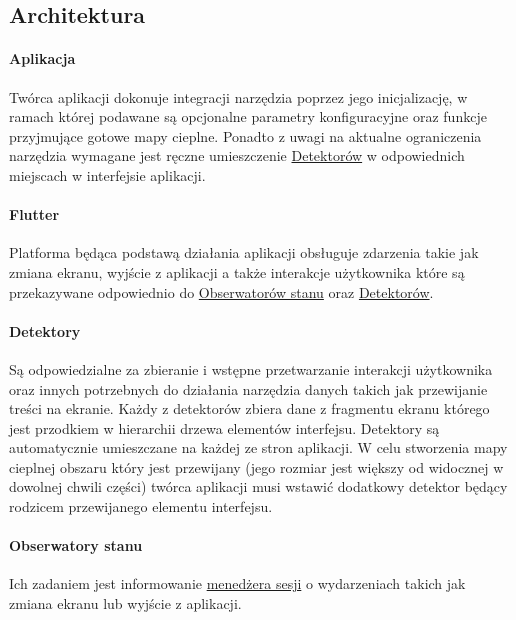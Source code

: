 \subsection{Architektura}

\paragraph{Aplikacja}
Twórca aplikacji dokonuje integracji narzędzia poprzez jego inicjalizację, w ramach której podawane są  opcjonalne parametry konfiguracyjne oraz funkcje przyjmujące gotowe mapy cieplne. Ponadto z uwagi na aktualne ograniczenia narzędzia wymagane jest ręczne umieszczenie \hyperref[par:rs_detectors]{Detektorów} w odpowiednich miejscach w interfejsie aplikacji.

\paragraph{Flutter} Platforma będąca podstawą działania aplikacji obsługuje zdarzenia takie jak zmiana ekranu, wyjście z aplikacji a także interakcje użytkownika które są przekazywane odpowiednio do \hyperref[par:rs_observers]{Obserwatorów stanu} oraz \hyperref[par:rs_detectors]{Detektorów}.

\paragraph{Detektory} 
\label{par:rs_detectors}
Są odpowiedzialne za zbieranie i wstępne przetwarzanie interakcji użytkownika oraz innych potrzebnych do działania narzędzia danych takich jak przewijanie treści na ekranie. Każdy z detektorów zbiera dane z fragmentu ekranu którego jest przodkiem w hierarchii drzewa elementów interfejsu. Detektory są automatycznie umieszczane na każdej ze stron aplikacji. W celu stworzenia mapy cieplnej obszaru który jest przewijany (jego rozmiar jest większy od widocznej w dowolnej chwili części) twórca aplikacji musi wstawić dodatkowy detektor będący rodzicem przewijanego elementu interfejsu.

\paragraph{Obserwatory stanu} 
\label{par:rs_observers}
Ich zadaniem jest informowanie \hyperref[par:rs_session_manager]{menedżera sesji} o wydarzeniach takich jak zmiana ekranu lub wyjście z aplikacji.

